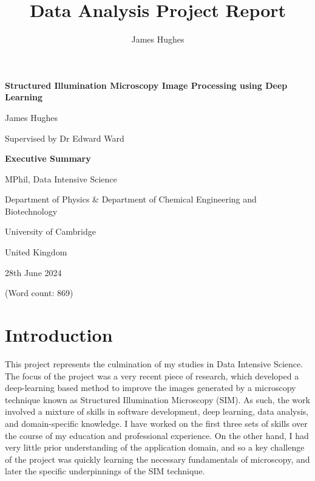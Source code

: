 \documentclass[12pt]{article}
\title{Data Analysis Project Report}
\author{James Hughes}
\begin{document}
\begin{titlepage}
    \begin{center}
        \vspace*{1cm}

        \Huge
        \textbf{Structured Illumination Microscopy Image Processing using Deep Learning}

        \vspace{0.5cm}
        \LARGE

        James Hughes

        Supervised by Dr Edward Ward

        \vspace{2cm}
        \Huge
        \textbf{Executive Summary}

        \vfill

        MPhil, Data Intensive Science

        \vspace{0.8cm}

        \Large
        Department of Physics \& Department of Chemical Engineering and Biotechnology

        University of Cambridge

        United Kingdom

        28th June 2024

        (Word count: 869)

    \end{center}
\end{titlepage}

\newpage

\newpage
\section*{Introduction}

This project represents the culmination of my studies in Data Intensive Science.
The focus of the project was a very recent piece of research,
which developed a deep-learning based method to improve the images generated by a microscopy technique known as Structured Illumination Microscopy (SIM).
As such, the work involved a mixture of skills in software development, deep learning, data analysis, and domain-specific knowledge.
I have worked on the first three sets of skills over the course of my education and professional experience.
On the other hand, I had very little prior understanding of the application domain,
and so a key challenge of the project was quickly learning the necessary fundamentals of microscopy,
and later the specific underpinnings of the SIM technique.
\end{document}
